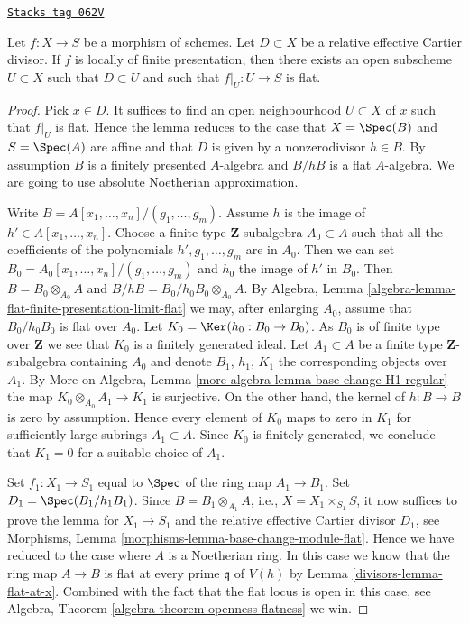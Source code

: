 \begin{lemma}
\label{divisors-lemma-flat-relative-Cartier-divisor}
\href{https://stacks.math.columbia.edu/tag/062V}{\texttt{Stacks tag 062V}}

Let $f : X \to S$ be a morphism of schemes.
Let $D \subset X$ be a relative effective Cartier divisor.
If $f$ is locally of finite presentation, then there exists
an open subscheme $U \subset X$ such that $D \subset U$ and
such that $f|_U : U \to S$ is flat.
\end{lemma}

\begin{proof}

Pick $x \in D$. It suffices to find an open neighbourhood $U \subset X$
of $x$ such that $f|_U$ is flat. Hence the lemma reduces to the case
that $X = \Spec(B)$ and $S = \Spec(A)$ are affine
and that $D$ is given by a nonzerodivisor $h \in B$. By assumption
$B$ is a finitely presented $A$-algebra and $B/hB$ is a flat
$A$-algebra. We are going to use absolute Noetherian approximation.

\medskip\noindent
Write $B = A[x_1, \ldots, x_n]/(g_1, \ldots, g_m)$. Assume
$h$ is the image of $h' \in A[x_1, \ldots, x_n]$. Choose a finite type
$\mathbf{Z}$-subalgebra $A_0 \subset A$ such that all the coefficients
of the polynomials $h', g_1, \ldots, g_m$ are in $A_0$. Then we can set
$B_0 = A_0[x_1, \ldots, x_n]/(g_1, \ldots, g_m)$ and $h_0$ the image
of $h'$ in $B_0$. Then $B = B_0 \otimes_{A_0} A$ and
$B/hB = B_0/h_0B_0 \otimes_{A_0} A$. By Algebra, Lemma
\ref{algebra-lemma-flat-finite-presentation-limit-flat}
we may, after enlarging $A_0$, assume that $B_0/h_0B_0$ is flat
over $A_0$. Let $K_0 = \Ker(h_0 : B_0 \to B_0)$.
As $B_0$ is of finite type over $\mathbf{Z}$ we see that $K_0$ is
a finitely generated ideal. Let $A_1 \subset A$ be a finite type
$\mathbf{Z}$-subalgebra containing $A_0$ and denote $B_1$, $h_1$, $K_1$
the corresponding objects over $A_1$. By
More on Algebra, Lemma \ref{more-algebra-lemma-base-change-H1-regular}
the map $K_0 \otimes_{A_0} A_1 \to K_1$ is surjective. On the other hand,
the kernel of $h : B \to B$ is zero by assumption. Hence every element
of $K_0$ maps to zero in $K_1$ for sufficiently large subrings
$A_1 \subset A$. Since $K_0$ is finitely generated, we conclude that
$K_1 = 0$ for a suitable choice of $A_1$.

\medskip\noindent
Set $f_1 : X_1 \to S_1$ equal to $\Spec$ of the
ring map $A_1 \to B_1$. Set $D_1 = \Spec(B_1/h_1B_1)$.
Since $B = B_1 \otimes_{A_1} A$, i.e., $X = X_1 \times_{S_1} S$,
it now suffices to prove the lemma for $X_1 \to S_1$ and the relative
effective Cartier divisor $D_1$, see
Morphisms, Lemma \ref{morphisms-lemma-base-change-module-flat}.
Hence we have reduced to the case where $A$ is a Noetherian ring.
In this case we know that the ring map $A \to B$ is flat at every
prime $\mathfrak q$ of $V(h)$ by
Lemma \ref{divisors-lemma-flat-at-x}.
Combined with the fact that the flat locus is open in this case, see
Algebra, Theorem \ref{algebra-theorem-openness-flatness}
we win.
\end{proof}

